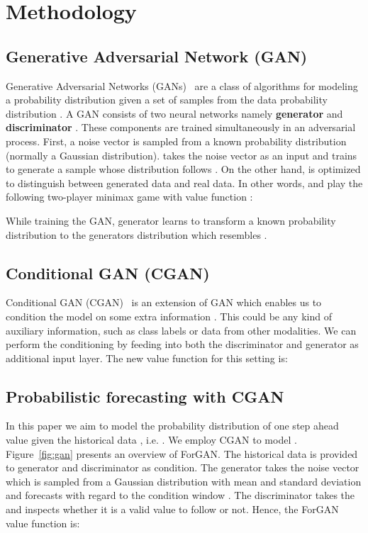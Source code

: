 \documentclass{ieeeaccess}
\begin{document}
\section{Methodology}
\label{sec:method}
\subsection{Generative Adversarial Network (GAN)}
Generative Adversarial Networks (GANs)~\cite{goodfellow2014generative} are a class of algorithms for modeling a probability distribution given a set of samples from the data probability distribution . A GAN consists of two neural networks namely \textbf{generator}  and \textbf{discriminator} . These components are trained simultaneously in an adversarial process. First, a noise vector  is sampled from a known probability distribution  (normally a Gaussian distribution).  takes the noise vector  as an input and trains to generate a sample whose distribution follows . On the other hand,  is optimized to distinguish between generated data and real data. In other words,  and  play the following two-player minimax game with value function :

While training the GAN, generator  learns to transform a known probability distribution  to the generators distribution  which resembles .

\subsection{Conditional GAN (CGAN)}
Conditional GAN (CGAN)~\cite{mirza2014conditional} is an extension of GAN which enables us to condition the model on some extra information . This could be any kind of auxiliary information, such as class labels or data from other modalities. We can perform the conditioning by feeding  into both the discriminator and generator as additional input layer. The new value function  for this setting is:



\subsection{Probabilistic forecasting with CGAN}

In this paper we aim to model the probability distribution of one step ahead value  given the historical data , i.e. . We employ CGAN to model . Figure~\ref{fig:gan} presents an overview of ForGAN. The historical data is provided to generator and discriminator as condition. The generator takes the noise vector which is sampled from a Gaussian distribution with mean  and standard deviation  and forecasts  with regard to the condition window . The discriminator takes the  and inspects whether it is a valid value to follow  or not. Hence, the ForGAN value function is:
\end{document}
